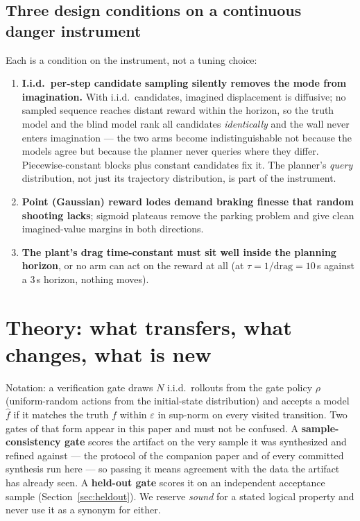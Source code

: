 \documentclass[11pt]{article}
\theoremstyle{definition}
\theoremstyle{remark}
\begin{document}
\subsection{Three design conditions on a continuous danger instrument}
\label{sec:lessons}

Each is a condition on the instrument, not a tuning choice:
\begin{enumerate}
\item \textbf{I.i.d.\ per-step candidate sampling silently removes the mode from imagination.} With i.i.d.\ candidates, imagined displacement is diffusive; no sampled sequence reaches distant reward within the horizon, so the truth model and the blind model rank all candidates \emph{identically} and the wall never enters imagination --- the two arms become indistinguishable not because the models agree but because the planner never queries where they differ. Piecewise-constant blocks plus constant candidates fix it. The planner's \emph{query} distribution, not just its trajectory distribution, is part of the instrument.
\item \textbf{Point (Gaussian) reward lodes demand braking finesse that random shooting lacks}; sigmoid plateaus remove the parking problem and give clean imagined-value margins in both directions.
\item \textbf{The plant's drag time-constant must sit well inside the planning horizon}, or no arm can act on the reward at all (at $\tau = 1/\mathrm{drag} = 10$\,s against a 3\,s horizon, nothing moves).
\end{enumerate}

\section{Theory: what transfers, what changes, what is new}
\label{sec:theory}

Notation: a verification gate draws $N$ i.i.d.\ rollouts from the gate policy $\rho$ (uniform-random actions from the initial-state distribution) and accepts a model $\hat f$ if it matches the truth $f$ within $\varepsilon$ in sup-norm on every visited transition. Two gates of that form appear in this paper and must not be confused. A \textbf{sample-consistency gate} scores the artifact on the very sample it was synthesized and refined against --- the protocol of the companion paper and of every committed synthesis run here --- so passing it means agreement with the data the artifact has already seen. A \textbf{held-out gate} scores it on an independent acceptance sample (Section~\ref{sec:heldout}). We reserve \emph{sound} for a stated logical property and never use it as a synonym for either.
\end{document}
